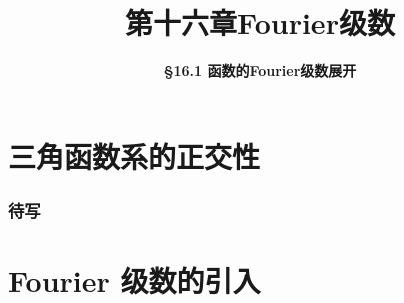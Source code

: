 \everymath{\displaystyle}



\title[第十六章\\
Fourier级数]{\texorpdfstring{\LARGE \bfseries 第十六章\quad Fourier级数}{第十六章 Fourier级数}} %
\author[\smaller \S 16.1\\
Fourier级数展开] %
{\Large \bfseries \S 16.1 函数的Fourier级数展开}
\date{}





\begin{frame}

\titlepage %

\end{frame}



\section{三角函数系的正交性}


\begin{frame}
\frametitle{待写}

\end{frame}


\section{Fourier 级数的引入}


